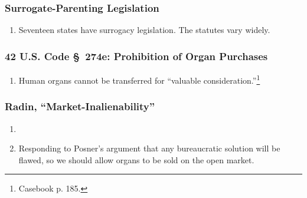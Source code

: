 \subsubsection{Surrogate-Parenting Legislation}

\begin{enumerate}
    \item Seventeen states have surrogacy legislation. The statutes vary 
    widely.
\end{enumerate}

\subsubsection{42 U.S. Code \S\ 274e: Prohibition of Organ Purchases}

\begin{enumerate}
    \item Human organs cannot be transferred for ``valuable 
    consideration.''\footnote{Casebook p. 185.}
\end{enumerate}

\subsubsection{Radin, ``Market-Inalienability''}

\begin{enumerate}
    \item %
    \item Responding to Posner's argument that any bureaucratic solution will 
    be flawed, so we should allow organs to be sold on the open market.
\end{enumerate}
